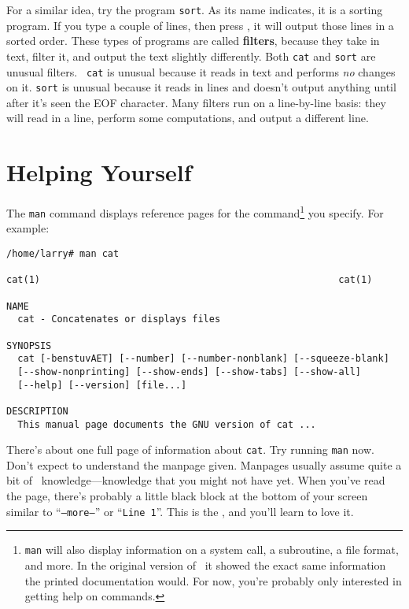For a similar idea, try the program {\tt sort}. As its
name indicates, it is a sorting program.  If you type a couple of
lines, then press \eof, it will output those lines in a sorted order.
These types of programs are called {\bf filters},
because they take in text, filter it, and output the text slightly
differently.  Both {\tt cat} and {\tt sort} are unusual filters.  {\tt
  cat} is unusual because it reads in text and performs \emph{no}
changes on it.  {\tt sort} is unusual because it reads in lines and
doesn't output anything until after it's seen the EOF character.  Many
filters run on a line-by-line basis: they will read in a line, perform
some computations, and output a different line.

\section{Helping Yourself}\label{man-section}

The {\tt man} command displays reference pages for the
command\footnote{{\tt man} will also display information on a system
  call, a subroutine, a file format, and more.  In the original
  version of \unix\ it showed the exact same information the printed
  documentation would.  For now, you're probably only interested in
  getting help on commands.} you specify. For example:

\begin{screen}
\begin{verbatim}
/home/larry# man cat

cat(1)                                                     cat(1)

NAME
  cat - Concatenates or displays files

SYNOPSIS
  cat [-benstuvAET] [--number] [--number-nonblank] [--squeeze-blank]
  [--show-nonprinting] [--show-ends] [--show-tabs] [--show-all]
  [--help] [--version] [file...]

DESCRIPTION
  This manual page documents the GNU version of cat ...
\end{verbatim}
\end{screen}

There's about one full page of information about {\tt cat}. Try
running {\tt man} now.  Don't expect to understand the manpage given.
Manpages usually assume quite a bit of \unix\ knowledge---knowledge
that you might not have yet.  When you've read the page, there's
probably a little black block at the bottom of your screen similar to
``{\tt --more--}'' or ``{\tt Line 1}''.  This is the
, and you'll learn to love it.

